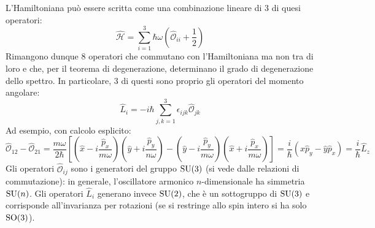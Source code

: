 L'Hamiltoniana può essere scritta come una combinazione lineare di 3 di quesi operatori:
\begin{equation}
	\hat{\mathcal{H}} = \sum_{i = 1}^{3} \hbar \omega \left( \hat{\mathcal{O}}_{ii} + \frac{1}{2} \right)
	\label{eq:3.41}
\end{equation}
Rimangono dunque 8 operatori che commutano con l'Hamiltoniana ma non tra di loro e che, per il teorema di degenerazione, determinano il grado di degenerazione dello spettro. In particolare, 3 di questi sono proprio gli operatori del momento angolare:
\begin{equation}
	\hat{L}_i = - i\hbar \sum_{j,k = 1}^{3} \epsilon_{ijk} \hat{\mathcal{O}}_{jk}
	\label{eq:3.42}
\end{equation}
Ad esempio, con calcolo esplicito:
\begin{equation*}
	\hat{\mathcal{O}}_{12} - \hat{\mathcal{O}}_{21} = \frac{m \omega}{2\hbar} \left[ \left( \hat{x} - i \frac{\hat{p}_x}{m\omega} \right) \left( \hat{y} + i \frac{\hat{p}_y}{n\omega} \right) - \left( \hat{y} - i \frac{\hat{p}_y}{m\omega} \right) \left( \hat{x} + i \frac{\hat{p}_x}{m\omega} \right) \right] = \frac{i}{\hbar} \left( \hat{x} \hat{p}_y - \hat{y} \hat{p}_x \right) = \frac{i}{\hbar} \hat{L}_z
\end{equation*}
Gli operatori $ \hat{\mathcal{O}}_{ij} $ sono i generatori del gruppo $ \mathrm{SU}(3) $ (si vede dalle relazioni di commutazione): in generale, l'oscillatore armonico $ n $-dimensionale ha simmetria $ \mathrm{SU}(n) $. Gli operatori $ \hat{L}_i $ generano invece $ \mathrm{SU}(2) $, che è un sottogruppo di $ \mathrm{SU}(3) $ e corrisponde all'invarianza per rotazioni (se si restringe allo spin intero si ha solo $ \mathrm{SO}(3) $).











